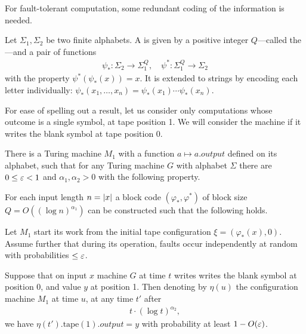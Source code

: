 \documentclass[11pt]{memoir}
\theoremstyle{definition} %
\renewcommand{\le}{\leq}
\newcommand{\Output}{\mathit{output}}
\newcommand{\Q}{Q}
\newcommand{\tape}{\mathrm{tape}}
\begin{document}
For fault-tolerant computation, some redundant coding of the information is needed.

\begin{definition}[Codes]\label{def:codes}
    Let \( \Sigma_{1},\Sigma_{2} \) be two finite alphabets.
    A  is given by a positive integer \( \Q \)---called
    the ---and a pair of functions
    \begin{align*}
            \psi_{*} :\Sigma_{2}\to\Sigma_{1}^{\Q},
            \quad
            \psi^{*}:\Sigma_{1}^{\Q}\to\Sigma_{2}
    \end{align*}
    with the property \( \psi^{*}(\psi_{*}(x))=x \).
It is extended to strings by encoding each letter individually:
\( \psi_{*}(x_{1},\dots,x_{n})=\psi_{*}(x_{1})\dotsm\psi_{*}(x_{n}) \).
\end{definition}

For ease of spelling out a result, let us consider only computations whose outcome
is a single symbol, at tape position 1.
We will consider the machine  if it writes the blank symbol at tape position 0.

\begin{theorem}\label{thm:main-main}
There is a Turing machine \( M_{1} \) with a 
function \( a\mapsto a.\Output \) defined on its alphabet, 
such that
for any Turing machine \( G \) with alphabet \( \Sigma \)
there are \( 0\le\eps <1 \) and \( \alpha_{1},\alpha_{2}>0 \) 
with the following property.

For each input length \( n=\lvert x \rvert \) a block code
\( (\varphi_{*}, \varphi^{*}) \) of block size \( \Q=O((\log n)^{\alpha_{1}}) \) can be constructed 
such that the following holds.

Let \( M_{1} \) start its work from the initial tape configuration \( \xi=(\varphi_{*}(x),0) \).
Assume further that
during its operation, faults occur independently at random with probabilities \( \le \eps \).

Suppose that on input \( x \) machine \( G \) at time \( t \) writes writes the blank symbol
at position 0, and value \( y \) at position 1.
Then denoting by \( \eta(u) \) the configuration machine \( M_{1} \) at time \( u \),
at any time \( t' \) after
 \begin{align*}
   t\cdot (\log t)^{\alpha_{2}},
 \end{align*}
we have \( \eta(t').\tape(1).\Output= y \)
with probability at least \( 1 - O(\varepsilon) \).
\end{theorem}
\end{document}
